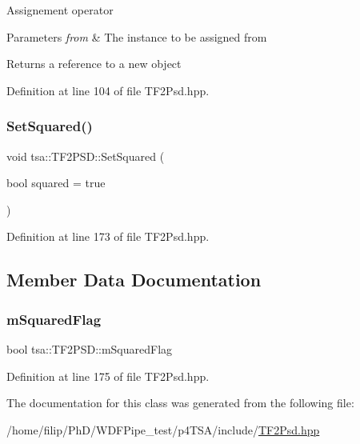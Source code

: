 Assignement operator


\begin{DoxyParams}{Parameters}
{\em from} & The instance to be assigned from\\
\hline
\end{DoxyParams}
\begin{DoxyReturn}{Returns}
a reference to a new object 
\end{DoxyReturn}


Definition at line 104 of file T\+F2\+Psd.\+hpp.

\mbox{\label{classtsa_1_1_t_f2_p_s_d_ac290dcfd9dc0a822c0df47eceee73692}} 
\subsubsection{\texorpdfstring{Set\+Squared()}{SetSquared()}}
{\footnotesize\ttfamily void tsa\+::\+T\+F2\+P\+S\+D\+::\+Set\+Squared (\begin{DoxyParamCaption}\item[{bool}]{squared = {\ttfamily true} }\end{DoxyParamCaption})\hspace{0.3cm}{\ttfamily [inline]}}



Definition at line 173 of file T\+F2\+Psd.\+hpp.



\subsection{Member Data Documentation}
\mbox{\label{classtsa_1_1_t_f2_p_s_d_a9f8b0c7e90cf9e22c994313e5e92cabe}} 
\subsubsection{\texorpdfstring{m\+Squared\+Flag}{mSquaredFlag}}
{\footnotesize\ttfamily bool tsa\+::\+T\+F2\+P\+S\+D\+::m\+Squared\+Flag\hspace{0.3cm}{\ttfamily [private]}}



Definition at line 175 of file T\+F2\+Psd.\+hpp.



The documentation for this class was generated from the following file\+:\begin{DoxyCompactItemize}
\item 
/home/filip/\+Ph\+D/\+W\+D\+F\+Pipe\+\_\+test/p4\+T\+S\+A/include/\hyperlink{_t_f2_psd_8hpp}{T\+F2\+Psd.\+hpp}\end{DoxyCompactItemize}
